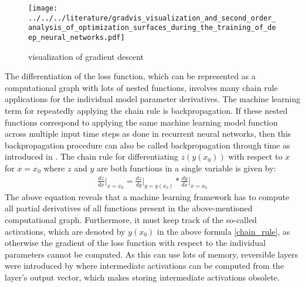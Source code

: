 \documentclass[draft,final]{vutinfth} %
\begin{document}
    \begin{figure}[H]
        \centering{}
        \texttt{[image: ../../../literature/gradvis\_visualization\_and\_second\_order\_analysis\_of\_optimization\_surfaces\_during\_the\_training\_of\_deep\_neural\_networks.pdf]}
        \caption{visualization of gradient descent}
        \label{fig:gradient_descent_vis}
    \end{figure}
    The differentiation of the loss function, which can be represented as a computational graph with lots of nested functions, involves many chain rule applications for the individual model parameter derivatives. The machine learning term for repeatedly applying the chain rule is backpropagation.
    If these nested functions correspond to applying the same machine learning model function across multiple input time steps as done in recurrent neural networks, then this backpropagation procedure can also be called backpropagation through time as introduced in \cite{GradientDescent}.
    The chain rule for differentiating $z(y(x_0))$ with respect to $x$ for $x=x_0$ where $z$ and $y$ are both functions in a single variable is given by:
    \begin{align}
    \label{chain_rule}
    \frac{dz}{dx} \Bigr\rvert_{x=x_0} = \frac{dz}{dy} \Bigr\rvert_{y=y(x_0)} * \frac{dy}{dx} \Bigr\rvert_{x=x_0}
    \end{align}
    The above equation reveals that a machine learning framework has to compute all partial derivatives of all functions present in the above-mentioned computational graph.
    Furthermore, it must keep track of the so-called activations, which are denoted by $y(x_0)$ in the above formula \ref{chain_rule}, as otherwise the gradient of the loss function with respect to the individual parameters cannot be computed.
    As this can use lots of memory, reversible layers were introduced by \cite{ReversibleLayer} where intermediate activations can be computed from the layer’s output vector, which makes storing intermediate activations obsolete.
\end{document}
